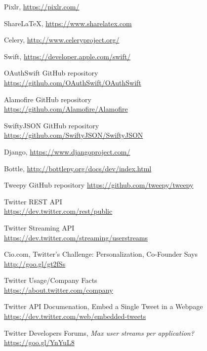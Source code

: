 \documentclass{article}
\begin{document}
\begin{thebibliography}{9}
    Pixlr, \url{https://pixlr.com/}
     
    ShareLaTeX, \url{https://www.sharelatex.com}
    
    Celery, \url{http://www.celeryproject.org/}

    Swift, \url{https://developer.apple.com/swift/}
    
    OAuthSwift GitHub repository \\
    \phantom{ } \url{https://github.com/OAuthSwift/OAuthSwift}
    
    Alamofire GitHub repository \\
    \phantom{ } \url{https://github.com/Alamofire/Alamofire}
    
    SwiftyJSON GitHub repository \\
    \phantom{ } \url{https://github.com/SwiftyJSON/SwiftyJSON}
    
    Django, \url{https://www.djangoproject.com/}
    
    Bottle, \url{http://bottlepy.org/docs/dev/index.html}
    
    Tweepy GitHub repository \url{https://github.com/tweepy/tweepy}

    Twitter REST API \\
    \phantom{ } \url{https://dev.twitter.com/rest/public}

    Twitter Streaming API \\ 
    \phantom{ } \url{https://dev.twitter.com/streaming/userstreams}
    
    Cio.com, Twitter's Challenge: Personalization, Co-Founder Says \\
    \phantom{ } \url{http://goo.gl/gt2fSs}

    Twitter Usage/Company Facts \\
    \phantom{ } \url{https://about.twitter.com/company}

    Twitter API Documenation, Embed a Single Tweet in a Webpage \\
    \phantom{ } \url{https://dev.twitter.com/web/embedded-tweets}
    
    Twitter Developers Forums, \textit{Max user streams per application?} \\
    \phantom{ } \url{https://goo.gl/YnYuL8}
    

\end{thebibliography}
\end{document}
